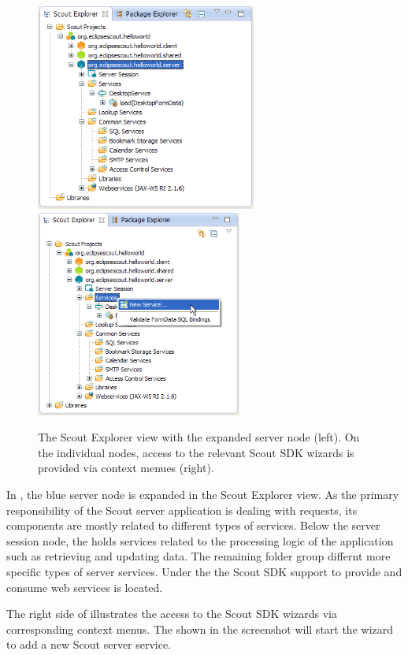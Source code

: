 \documentclass[a4paper,10pt,twoside]{book}
\begin{document}
\begin{figure}
\includegraphics[height=6.8cm]{explorer_server.png} \hspace{5mm} 
\includegraphics[height=6.8cm]{explorer_server_servicewizard.png}
\caption{The Scout Explorer view with the expanded server node (left). On the individual nodes, access to the relevant Scout SDK wizards is provided via context menues (right).}
\end{figure}

In , the blue server node is expanded in the Scout Explorer view. 
As the primary responsibility of the Scout server application is dealing with requests, its components are mostly related to different types of services. 
Below the server session node, the  holds services related to the processing logic of the application such as retrieving and updating data. 
The remaining folder group differnt more specific types of server services. 
Under the  the Scout SDK support to provide and consume web services is located. 

The right side of  illustrates the access to the Scout SDK wizards via corresponding context menus. 
The  shown in the screenshot will start the wizard to add a new Scout server service. 
 
\end{document}

